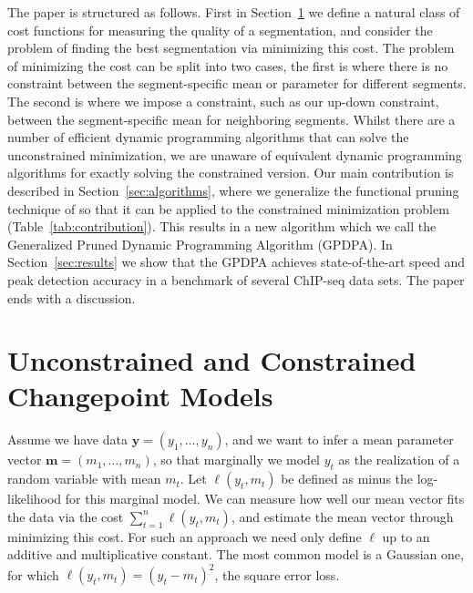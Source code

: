 \documentclass[aoas]{imsart}
\begin{document}
The paper is structured as follows. First in Section~\ref{sec:models} we define a natural class of cost functions for 
measuring the quality of a segmentation, and consider the problem of finding the best segmentation
via minimizing this cost. The problem of minimizing the cost can be split into two cases, the first
is where there is no constraint between the segment-specific mean or parameter for different segments. The
second is where we impose a constraint, such as our up-down constraint, between the segment-specific
mean for neighboring segments. Whilst there are a number of efficient dynamic programming algorithms
that can solve the unconstrained minimization, we are unaware of equivalent dynamic programming
algorithms for exactly solving the constrained version.  Our main contribution is described in 
Section~\ref{sec:algorithms}, where we generalize the functional pruning
technique of \citet{pruned-dp} so that it can be applied to the constrained minimization problem (Table~\ref{tab:contribution}). This
results in a new algorithm which we call the Generalized
Pruned Dynamic Programming Algorithm (GPDPA). In Section~\ref{sec:results} 
we show that the GPDPA achieves state-of-the-art speed and peak detection accuracy in a benchmark of several ChIP-seq data sets. The paper ends with a discussion.

\section{Unconstrained and Constrained Changepoint Models}
\label{sec:models}

Assume we have data $\mathbf y=(y_1,\ldots,y_n)$, and we want to infer
a mean parameter vector $\mathbf m=(m_1,\ldots,m_n)$, so that marginally
we model $y_t$ as the realization of a random variable with mean $m_t$. 
Let $\ell(y_t,m_t)$ be defined as minus the log-likelihood for this marginal model.
We can measure how well our mean vector fits the data via the cost
$\sum_{t=1}^n \ell(y_t,m_t)$, and estimate the mean vector through minimizing this cost.
For such an approach we need only define $\ell$ up to an additive and multiplicative constant. The
most common model is a Gaussian one, for which $\ell(y_t,m_t)=(y_t-m_t)^2$, the square error loss.
\end{document}
